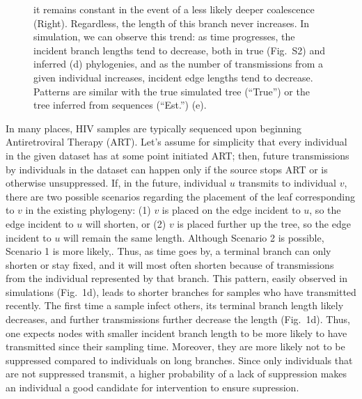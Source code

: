 \documentclass[a4paper,11pt]{article}
\newcommand{\PLWH}{sample\xspace}
\begin{document}
\begin{figure}[!tp]
{%
it remains constant in the event of a less likely deeper coalescence (Right). Regardless, the length of this branch  never increases.
In simulation, we can observe this trend: as time progresses, the incident branch lengths %
tend to decrease, both in true (Fig.~S2) and inferred (d) phylogenies, and as the number of transmissions from a given individual increases, incident edge lengths tend to decrease. Patterns are similar with the true simulated tree (``True'') or the tree inferred from sequences (``Est.'') (e).}
\label{fig:diagram}
\end{figure}


In many places, HIV
\PLWH{s} are typically sequenced
upon beginning Antiretroviral Therapy (ART).
Let's assume for simplicity that every individual in the given dataset has at some point initiated ART; then,
 future transmissions by individuals in the dataset can happen only if the source stops ART or is otherwise unsuppressed. %
If, in the future,
individual $u$  transmits to individual $v$,
there are two possible scenarios regarding the placement of the leaf corresponding to $v$ in the existing  phylogeny:
(1) $v$ is placed on the edge incident to $u$, so the edge incident to $u$ will shorten, or (2) $v$ is  placed further up the tree, so the edge incident to $u$ will remain the same length.
Although Scenario 2 is possible,
Scenario 1 is more likely,\supercite{Romero-Severson2016}.
Thus, as time goes by, a terminal branch can only shorten or stay fixed, and it will most often shorten because of  transmissions from the individual represented by that branch.
This pattern, easily observed in simulations (Fig.~1d), leads to shorter branches for \PLWH{s} who have transmitted recently.
The first time a \PLWH infect others, its terminal branch length likely decreases, and further transmissions further decrease the  length (Fig.~1d). 
Thus, one expects nodes with smaller incident branch length to be more likely to have transmitted since their sampling time.
Moreover, they are more likely not to be  suppressed compared to individuals on long branches. 
Since only individuals that are not suppressed transmit, a higher probability of a lack of suppression makes an individual a good candidate for intervention to ensure supression. 
\end{document}
